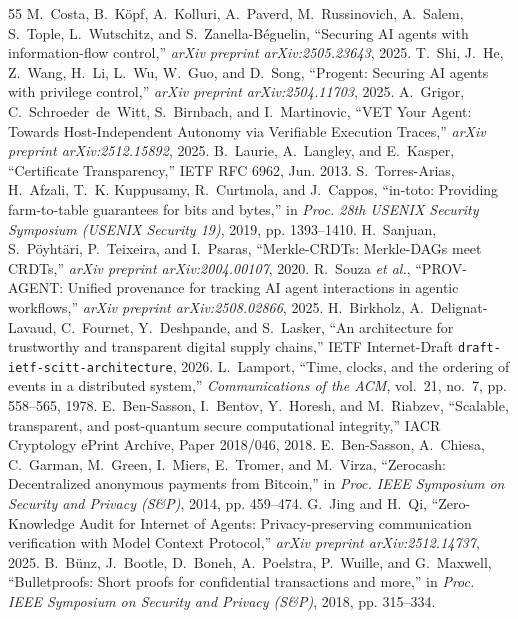 \documentclass[conference,10pt]{IEEEtran}
\begin{document}
\begin{thebibliography}{55}
 M.~Costa, B.~K{\"o}pf, A.~Kolluri, A.~Paverd, M.~Russinovich, A.~Salem, S.~Tople, L.~Wutschitz, and S.~Zanella-B{\'e}guelin, ``Securing AI agents with information-flow control,'' \textit{arXiv preprint arXiv:2505.23643}, 2025.
 T.~Shi, J.~He, Z.~Wang, H.~Li, L.~Wu, W.~Guo, and D.~Song, ``Progent: Securing AI agents with privilege control,'' \textit{arXiv preprint arXiv:2504.11703}, 2025.
 A.~Grigor, C.~Schroeder~de~Witt, S.~Birnbach, and I.~Martinovic, ``VET Your Agent: Towards Host-Independent Autonomy via Verifiable Execution Traces,'' \textit{arXiv preprint arXiv:2512.15892}, 2025.
 B.~Laurie, A.~Langley, and E.~Kasper, ``Certificate Transparency,'' IETF RFC 6962, Jun. 2013.
 S.~Torres-Arias, H.~Afzali, T.~K. Kuppusamy, R.~Curtmola, and J.~Cappos, ``in-toto: Providing farm-to-table guarantees for bits and bytes,'' in \textit{Proc. 28th USENIX Security Symposium (USENIX Security 19)}, 2019, pp. 1393--1410.
 H.~Sanjuan, S.~P{\"o}yht{\"a}ri, P.~Teixeira, and I.~Psaras, ``Merkle-CRDTs: Merkle-DAGs meet CRDTs,'' \textit{arXiv preprint arXiv:2004.00107}, 2020.
 R.~Souza \textit{et al.}, ``PROV-AGENT: Unified provenance for tracking AI agent interactions in agentic workflows,'' \textit{arXiv preprint arXiv:2508.02866}, 2025.
 H.~Birkholz, A.~Delignat-Lavaud, C.~Fournet, Y.~Deshpande, and S.~Lasker, ``An architecture for trustworthy and transparent digital supply chains,'' IETF Internet-Draft \texttt{draft-ietf-scitt-architecture}, 2026.
 L.~Lamport, ``Time, clocks, and the ordering of events in a distributed system,'' \textit{Communications of the ACM}, vol.~21, no.~7, pp. 558--565, 1978.
 E.~Ben-Sasson, I.~Bentov, Y.~Horesh, and M.~Riabzev, ``Scalable, transparent, and post-quantum secure computational integrity,'' IACR Cryptology ePrint Archive, Paper 2018/046, 2018.
 E.~Ben-Sasson, A.~Chiesa, C.~Garman, M.~Green, I.~Miers, E.~Tromer, and M.~Virza, ``Zerocash: Decentralized anonymous payments from Bitcoin,'' in \textit{Proc. IEEE Symposium on Security and Privacy (S\&P)}, 2014, pp. 459--474.
 G.~Jing and H.~Qi, ``Zero-Knowledge Audit for Internet of Agents: Privacy-preserving communication verification with Model Context Protocol,'' \textit{arXiv preprint arXiv:2512.14737}, 2025.
 B.~B{\"u}nz, J.~Bootle, D.~Boneh, A.~Poelstra, P.~Wuille, and G.~Maxwell, ``Bulletproofs: Short proofs for confidential transactions and more,'' in \textit{Proc. IEEE Symposium on Security and Privacy (S\&P)}, 2018, pp. 315--334.

\end{thebibliography}
\end{document}
